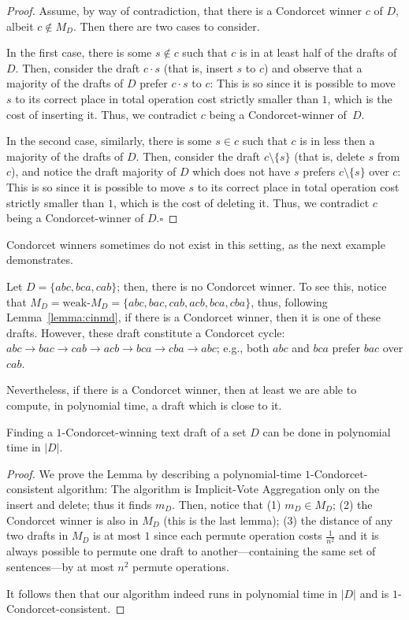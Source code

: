 \documentclass[sigconf]{aamas}  %
\newcommand{\qqed}{\hfill$\square$}
\begin{document}
\begin{proof}
%
Assume, by way of contradiction, that there is a Condorcet winner $c$ of $D$, albeit $c \notin M_D$. Then there are two cases to consider.

In the first case, there is some $s \notin c$ such that $c$ is in at least half of the drafts of $D$. Then, consider the draft $c \cdot s$ (that is, insert $s$ to $c$) and observe that a majority of the drafts of $D$ prefer $c \cdot s$ to $c$:
  This is so since it is possible to move $s$ to its correct place in total operation cost strictly smaller than $1$, which is the cost of inserting it. Thus, we contradict $c$ being a Condorcet-winner of~$D$.

In the second case, similarly, there is some $s \in c$ such that $c$ is in less then a majority of the drafts of $D$. Then, consider the draft $c \setminus \{s\}$ (that is, delete $s$ from $c$), and notice the draft majority of $D$ which does not have $s$ prefers $c \setminus \{s\}$ over $c$:
  This is so since it is possible to move $s$ to its correct place in total operation cost strictly smaller than $1$, which is the cost of deleting it. Thus, we contradict $c$ being a Condorcet-winner of $D$.\qqed
%
\end{proof}

Condorcet winners sometimes do not exist in this setting, as the next example demonstrates.

\begin{example}
%
Let $D = \{abc, bca, cab\}$; then, there is no Condorcet winner. To see this, notice that $M_D = \textrm{weak-}M_D = \{abc, bac, cab, acb, bca, cba\}$, thus, following Lemma~\ref{lemma:cinmd}, if there is a Condorcet winner, then it is one of these drafts. However, these draft constitute a Condorcet cycle: $abc \to bac \to cab \to acb \to bca \to cba \to abc$; e.g., both $abc$ and $bca$ prefer $bac$ over $cab$.
%
\end{example}

Nevertheless, if there is a Condorcet winner, then at least we are able to compute, in polynomial time, a draft which is close to it.

\begin{lemma}
  Finding a $1$-Condorcet-winning text draft of a set $D$ can be done in polynomial time in $|D|$.
\end{lemma}

\begin{proof}
%
We prove the Lemma by describing a polynomial-time $1$-Condorcet-consistent algorithm:
  The algorithm is Implicit-Vote Aggregation only on the insert and delete; thus it finds $m_D$.
Then, notice that
(1) $m_D \in M_D$;
(2) the Condorcet winner is also in $M_D$ (this is the last lemma);
(3) the distance of any two drafts in $M_D$ is at most $1$  since each permute operation costs $\frac{1}{n^2}$ and it is always possible to permute one draft to another---containing the same set of sentences---by at most $n^2$ permute operations.

It follows then that our algorithm indeed runs in polynomial time in $|D|$ and is $1$-Condorcet-consistent.
%
\end{proof}
\end{document}
